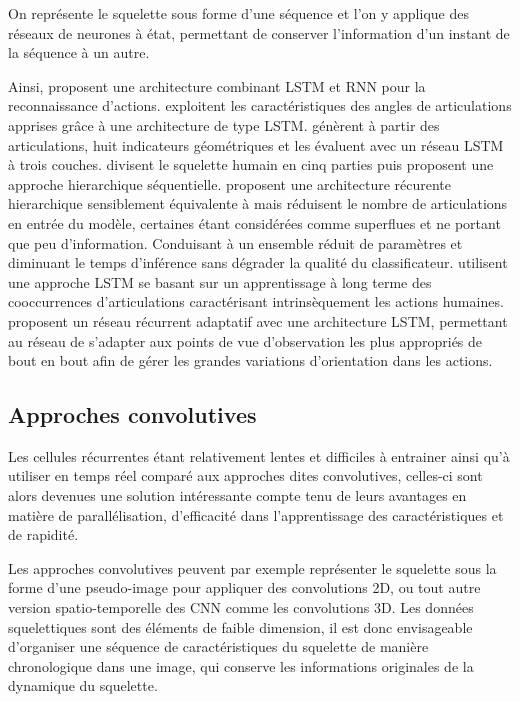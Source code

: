 On représente le squelette sous forme d’une séquence et l'on y applique des réseaux de neurones à état, permettant de conserver l’information d’un instant de la séquence à un autre.

Ainsi, \cite{baccouche2011sequential} proposent une architecture combinant LSTM et RNN pour la reconnaissance d'actions.
 \cite{avola2018exploiting} exploitent les caractéristiques des angles de articulations apprises grâce à une architecture de type LSTM. 
\cite{zhang2017geometric} génèrent à partir des articulations, huit indicateurs géométriques et les évaluent avec un réseau LSTM à trois couches.
\cite{du2015hierarchical} divisent le squelette humain en cinq parties puis proposent une approche hierarchique séquentielle.
\cite{shukla2017recurrent} proposent une architecture récurente hierarchique sensiblement équivalente à \cite{du2015hierarchical} mais réduisent le nombre de articulations en entrée du modèle, certaines étant considérées comme superflues et ne portant que peu d'information. Conduisant à un ensemble réduit de paramètres et diminuant le temps d'inférence sans dégrader la qualité du classificateur.
\cite{shahroudy2016ntu} utilisent une approche LSTM se basant sur un apprentissage à long terme des cooccurrences d'articulations caractérisant intrinsèquement les actions humaines.
\cite{zhang2017view} proposent un réseau récurrent adaptatif avec une architecture LSTM, permettant au réseau de s'adapter aux points de vue d'observation les plus appropriés de bout en bout afin de gérer les grandes variations d'orientation dans les actions.

\subsection{Approches convolutives}
Les cellules récurrentes étant relativement lentes et difficiles à entrainer ainsi qu'à utiliser en temps réel comparé aux approches dites convolutives, celles-ci sont alors devenues une solution intéressante compte tenu de leurs avantages en matière de parallélisation, d'efficacité dans l'apprentissage des caractéristiques et de rapidité.


Les approches convolutives peuvent par exemple représenter le squelette sous la forme d'une pseudo-image pour appliquer des convolutions 2D, ou tout autre version spatio-temporelle des CNN comme les convolutions 3D. Les données squelettiques sont des éléments de faible dimension, il est donc envisageable d'organiser une séquence de caractéristiques du squelette de manière chronologique dans une image, qui conserve les informations originales de la dynamique du squelette.


